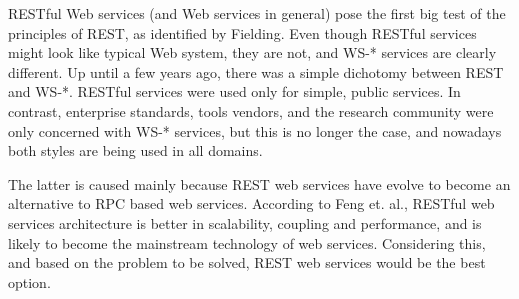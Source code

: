 RESTful Web services (and Web services in general) pose the first big test of the principles of REST, as identified by Fielding. Even though RESTful services might look like typical Web system, they are not, and WS-* services are clearly different. Up until a few years ago, there was a simple dichotomy between REST and WS-*. RESTful services were used only for simple, public services. In contrast, enterprise standards, tools vendors, and the research community were only concerned with WS-* services, but this is no longer the case, and nowadays both styles are being used in all domains.

The latter is caused mainly because REST web services have evolve to become an alternative to RPC based web services. According to Feng et. al.\cite{Feng:2009}, RESTful web services architecture is better in scalability, coupling and performance, and is likely to become the mainstream technology of web services. Considering this, and based on the problem to be solved, REST web services would be the best option.
